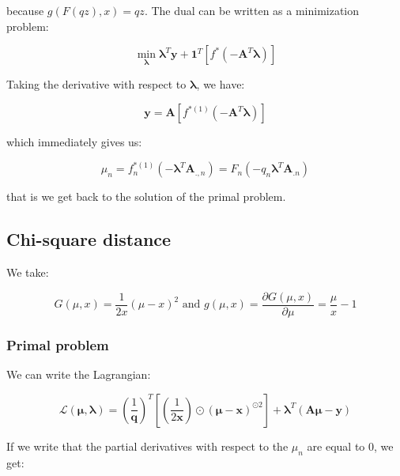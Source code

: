 \documentclass{tex/note}
\begin{document}
because $g \left( F \left( qz \right) , x \right) = q z$. The dual can be written as a minimization problem:

\begin{equation*}
\min_{\bm{\lambda}} \bm{\lambda}^T \bm{y} + \bm{1}^T \left[ f^* \left( - \bm{A}^T \bm{\lambda} \right) \right] 
\end{equation*}

Taking the derivative with respect to $\bm{\lambda}$, we have:

\begin{equation*}
\bm{y} = \bm{A} \left[ f^{* \left( 1 \right)} \left( - \bm{A}^T \bm{\lambda} \right) \right]
\end{equation*}

which immediately gives us:

\begin{equation*}
\mu_n = f_n^{* \left( 1 \right)} \left( - \bm{\lambda}^T \bm{A}_{.,n} \right) = F_n \left( - q_n \bm{\lambda}^T \bm{A}_{.n} \right)
\end{equation*}

that is we get back to the solution of the primal problem.

\subsection{Chi-square distance}

We take:

\begin{equation*}
G \left( \mu , x \right) = \frac{1}{2 x} \left( \mu - x \right) ^2 \text{ and } g \left( \mu , x \right) = \frac{\partial G \left( \mu , x \right)}{\partial \mu} = \frac{\mu}{x} - 1
\end{equation*}

\subsubsection{Primal problem}

We can write the Lagrangian:

\begin{equation*}
\mathcal{L} \left( \bm{\mu} , \bm{\lambda} \right) = \left( \frac{1}{\bm{q}} \right)^T \left[ \left( \frac{1}{2 \bm{x}} \right) \odot \left( \bm{\mu} - \bm{x} \right)^{\odot 2} \right] + \bm{\lambda}^T \left( \bm{A} \bm{\mu} - \bm{y} \right)
\end{equation*}

If we write that the partial derivatives with respect to the $\mu_n$ are equal to $0$, we get:
\end{document}
